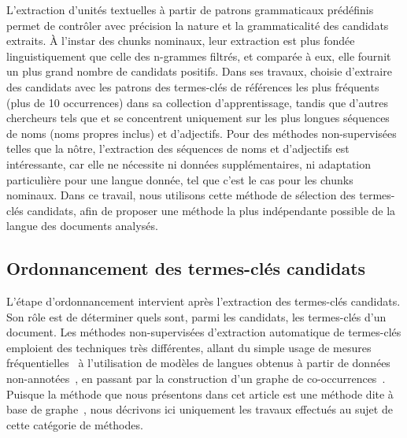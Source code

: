     L'extraction d'unités textuelles à partir de patrons grammaticaux prédéfinis
    permet de contrôler avec précision la nature et la grammaticalité des
    candidats extraits. À l'instar des chunks nominaux, leur extraction est plus
    fondée linguistiquement que celle des n-grammes filtrés, et comparée à eux,
    elle fournit un plus grand nombre de candidats positifs. Dans ses travaux,
     choisie d'extraire des candidats avec
    les patrons des termes-clés de références les plus fréquents (plus de 10
    occurrences) dans sa collection d'apprentissage, tandis que d'autres
    chercheurs tels que  et
     se concentrent uniquement sur les plus
    longues séquences de noms (noms propres inclus) et d'adjectifs. Pour des
    méthodes non-supervisées telles que la nôtre, l'extraction des séquences de 
    noms et d'adjectifs est intéressante, car elle ne nécessite ni données
    supplémentaires, ni adaptation particulière pour une langue donnée, tel que
    c'est le cas pour les chunks nominaux. Dans ce travail, nous utilisons cette
    méthode de sélection des termes-clés candidats, afin de proposer une méthode
    la plus indépendante possible de la langue des documents analysés.

  \subsection{Ordonnancement des termes-clés candidats}
  \label{subsec:ordonnancement_des_termes_cles_candidats}
    L'étape d'ordonnancement intervient après l'extraction des termes-clés
    candidats. Son rôle est de déterminer quels sont, parmi les candidats, les
    termes-clés d'un document.
    Les méthodes non-supervisées d'extraction automatique de termes-clés
    emploient des techniques très différentes, allant du simple usage de mesures
    fréquentielles~\cite{paukkeri2010likey} à l'utilisation de modèles de
    langues obtenus à partir de données
    non-annotées~\cite{tomokiyo2003languagemodel}, en passant par la
    construction d'un graphe de co-occurrences~\cite{mihalcea2004textrank}.
    Puisque la méthode que nous présentons dans cet article est une méthode dite
    \og à base de graphe~\fg, nous décrivons ici uniquement les travaux
    effectués au sujet de cette catégorie de méthodes.

